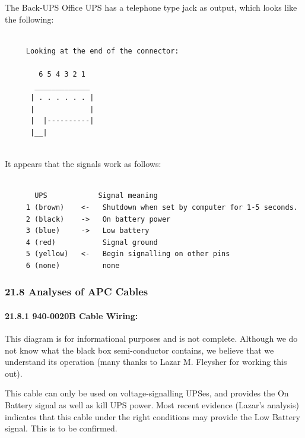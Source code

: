 \label{index-Cables_002c-BackUPS-Office-200}
\label{index-BackUPS-Office_002c-cables-201}
The Back-UPS Office UPS has a telephone type jack as output, which looks like
the following: 

\footnotesize
\begin{verbatim}
     
     Looking at the end of the connector:
     
        6 5 4 3 2 1
       _____________
      | . . . . . . |
      |             |
      |  |----------|
      |__|
     
\end{verbatim}
\normalsize

It appears that the signals work as follows: 

\footnotesize
\begin{verbatim}
     
       UPS            Signal meaning
     1 (brown)    <-   Shutdown when set by computer for 1-5 seconds.
     2 (black)    ->   On battery power
     3 (blue)     ->   Low battery
     4 (red)           Signal ground
     5 (yellow)   <-   Begin signalling on other pins
     6 (none)          none
\end{verbatim}
\normalsize

\label{Analyses-of-APC-Cables}

\subsubsection*{21.8 Analyses of APC Cables}

\label{index-Cables-202}

\label{940_002d0020B-Cable-Wiring}

\paragraph*{21.8.1 940-0020B Cable Wiring:}

\label{index-Cables-203}
This diagram is for informational purposes and is not complete. Although we do
not know what the black box semi-conductor contains, we believe that we
understand its operation (many thanks to Lazar M. Fleysher for working this
out).  

This cable can only be used on voltage-signalling UPSes, and provides the On
Battery signal as well as kill UPS power. Most recent evidence (Lazar's
analysis) indicates that this cable under the right conditions may provide the
Low Battery signal. This is to be confirmed. 

